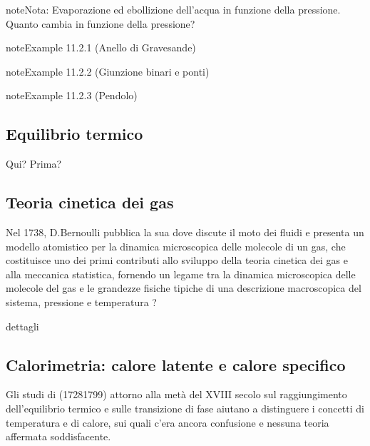 \documentclass[letterpaper,10pt,italian]{jupyterBook}
\begin{document}
\begin{sphinxadmonition}{note}{Nota:}
\sphinxAtStartPar
Evaporazione ed ebollizione dell’acqua in funzione della pressione. Quanto cambia in funzione della pressione?
\end{sphinxadmonition}


\label{ch/thermodynamics/foundation-experiments:example-1}
\begin{sphinxadmonition}{note}{Example 11.2.1 (Anello di Gravesande)}


\end{sphinxadmonition}
\label{ch/thermodynamics/foundation-experiments:example-2}
\begin{sphinxadmonition}{note}{Example 11.2.2 (Giunzione binari e ponti)}


\end{sphinxadmonition}
\label{ch/thermodynamics/foundation-experiments:example-3}
\begin{sphinxadmonition}{note}{Example 11.2.3 (Pendolo)}


\end{sphinxadmonition}




\subsection{Equilibrio termico}
\label{\detokenize{ch/thermodynamics/foundation-experiments:equilibrio-termico}}
\sphinxAtStartPar
  Qui? Prima? 


\subsection{Teoria cinetica dei gas}
\label{\detokenize{ch/thermodynamics/foundation-experiments:teoria-cinetica-dei-gas}}
\sphinxAtStartPar
Nel 1738, D.Bernoulli pubblica la sua  dove discute il moto dei fluidi e presenta un modello atomistico per la dinamica microscopica delle molecole di un gas, che costituisce uno dei primi contributi allo sviluppo della teoria cinetica dei gas e alla meccanica statistica, fornendo un legame tra la dinamica microscopica delle molecole del gas e le grandezze fisiche tipiche di una descrizione macroscopica del sistema, pressione e  temperatura  ? 

\sphinxAtStartPar
 dettagli 


\subsection{Calorimetria: calore latente e calore specifico}
\label{\detokenize{ch/thermodynamics/foundation-experiments:calorimetria-calore-latente-e-calore-specifico}}
\sphinxAtStartPar
Gli studi di  (1728\sphinxhyphen{}1799) attorno alla metà del XVIII secolo sul raggiungimento dell’equilibrio termico e sulle transizione di fase aiutano a distinguere i concetti di temperatura e di calore, sui quali c’era ancora confusione e nessuna teoria affermata soddisfacente.
\end{document}
